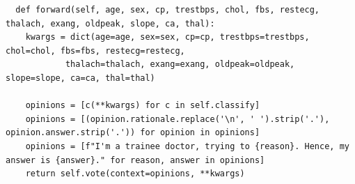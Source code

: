 \begin{lstlisting}
  def forward(self, age, sex, cp, trestbps, chol, fbs, restecg, thalach, exang, oldpeak, slope, ca, thal):
    kwargs = dict(age=age, sex=sex, cp=cp, trestbps=trestbps, chol=chol, fbs=fbs, restecg=restecg,
            thalach=thalach, exang=exang, oldpeak=oldpeak, slope=slope, ca=ca, thal=thal)
    
    opinions = [c(**kwargs) for c in self.classify]
    opinions = [(opinion.rationale.replace('\n', ' ').strip('.'), opinion.answer.strip('.')) for opinion in opinions]
    opinions = [f"I'm a trainee doctor, trying to {reason}. Hence, my answer is {answer}." for reason, answer in opinions]
    return self.vote(context=opinions, **kwargs)
\end{lstlisting}

    
    
    
    
    
    



        


